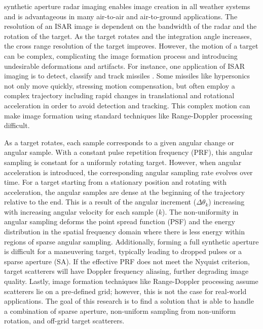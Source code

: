 \documentclass[journal]{IEEEtran}
\begin{document}
 synthetic aperture radar imaging enables image creation in all weather systems and is advantageous in many air-to-air and air-to-ground applications. The resolution of an ISAR image is dependent on the bandwidth of the radar and the rotation of the target. As the target rotates and the integration angle increases, the cross range resolution of the target improves. However, the motion of a target can be complex, complicating the image formation process and introducing undesirable deformations and artifacts. For instance, one application of ISAR imaging is to detect, classify and track missiles \cite{Liu_2012}. Some missiles like hypersonics not only move quickly, stressing motion compensation, but often employ a complex trajectory including rapid changes in translational and rotational acceleration in order to avoid detection and tracking. This complex motion can make image formation using standard techniques like Range-Doppler processing difficult. 

As a target rotates, each sample corresponds to a given angular change or angular sample. With a constant pulse repetition frequency (PRF), this angular sampling is constant for a uniformly rotating target. However, when angular acceleration is introduced, the corresponding angular sampling rate evolves over time. For a target starting from a stationary position and rotating with acceleration, the angular samples are dense at the beginning of the trajectory relative to the end. This is a result of the angular increment ($\Delta \theta_{k}$) increasing with increasing angular velocity for each sample ($k$). The non-uniformity in angular sampling deforms the point spread function (PSF) and the energy distribution in the spatial frequency domain where there is less energy within regions of sparse angular sampling. Additionally, forming a full synthetic aperture is difficult for a maneuvering target, typically leading to dropped pulses or a sparse aperture (SA). If the effective PRF does not meet the Nyquist criterion, target scatterers will have Doppler frequency aliasing, further degrading image quality. Lastly, image formation techniques like Range-Doppler processing assume scatterers lie on a pre-defined grid; however, this is not the case for real-world applications. The goal of this research is to find a solution that is able to handle a combination of sparse aperture, non-uniform sampling from non-uniform rotation, and off-grid target scatterers.
\end{document}
